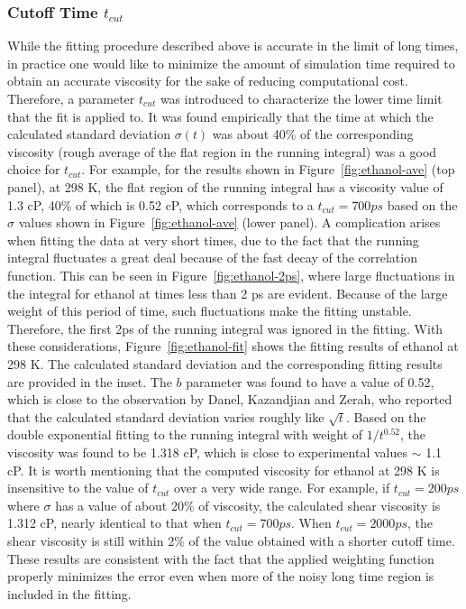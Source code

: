 \documentclass[12pt]{article}
\begin{document}
\subsubsection{Cutoff Time $t_{cut}$}
While the fitting procedure described above is accurate in the limit of long times, in practice one would like to minimize the amount of simulation time required to obtain an accurate viscosity for the sake of reducing computational cost.
Therefore, a parameter $t_{cut}$ was introduced to characterize the lower time limit that the fit is applied to.
It was found empirically that the time at which the calculated standard deviation $\sigma(t)$ was about 40\% of the corresponding viscosity
(rough average of the flat region in the running integral) was a good choice for $t_{cut}$.
For example, for the results shown in Figure~\ref{fig:ethanol-ave} (top panel),
at 298 K, the flat region of the running integral has a viscosity value of 1.3 cP,
40\% of which is 0.52 cP, which corresponds to a $t_{cut} = 700 ps$ based on the $\sigma$ values shown in Figure~\ref{fig:ethanol-ave} (lower panel).
A complication arises when fitting the data at very short times, due to the fact that the running integral fluctuates a great deal because of the fast decay of the correlation function. This can be seen in Figure~\ref{fig:ethanol-2ps}, where large fluctuations in the integral for ethanol at times less than 2 ps are evident.
Because of the large weight of this period of time,
such fluctuations make the fitting unstable.
Therefore, the first 2ps of the running integral was ignored in the fitting.
With these considerations,
Figure~\ref{fig:ethanol-fit} shows the fitting results of ethanol at 298 K.
The calculated standard deviation and the corresponding fitting results are provided in the inset.
The $b$ parameter was found to have a value of 0.52,
which is close to the observation by Danel, Kazandjian and Zerah,
\cite{Kazandjian.PRE.85.066701.2012}
who reported that the calculated standard deviation varies roughly like $\sqrt{t}$.
Based on the double exponential fitting to the running integral with weight of $1/t^{0.52}$,
the viscosity was found to be 1.318 cP,
which is close to experimental values $\sim$ 1.1 cP.
\cite{Jouyban.KJCE.29.812.2012,
Nain.JML.140.108.2008,
Bhuiyan.JML.138.139.2008,
Fonseca.JCED.52.1240.2007,
Taboas.JCED.51.940.2006,
Tojo.JCED.49.1590.2004}
It is worth mentioning that the computed viscosity for ethanol at 298 K is insensitive to the value of $t_{cut}$ over a very wide range. For example, if $t_{cut}= 200 ps$ 
where $\sigma$ has a value of about 20\% of viscosity, the calculated shear viscosity is 1.312 cP, nearly identical to that when $t_{cut} = 700 ps$.
When $t_{cut} = 2000 ps$, the shear viscosity is still within 2\% of the value obtained with a shorter cutoff time. These results are consistent with the fact that the applied weighting function properly minimizes the error even when more of the noisy long time region is included in the fitting.
\end{document}
